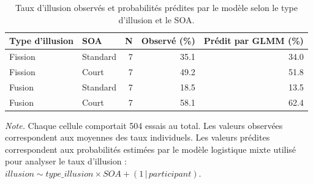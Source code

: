 \begin{table}[ht]
\centering
\caption{Taux d’illusion observés et probabilités prédites par le modèle selon le type d’illusion et le SOA.}
\label{tab:illusion_descriptives_v2}
\footnotesize
\begin{tabular}{llrrr}
\toprule
Type d’illusion & SOA & N & Observé (\%) & Prédit par GLMM (\%) \\
\midrule
Fission & Standard & 7 & 35.1 & 34.0 \\
Fission & Court & 7 & 49.2 & 51.8 \\
Fusion & Standard & 7 & 18.5 & 13.5 \\
Fusion & Court & 7 & 58.1 & 62.4 \\
\bottomrule
\end{tabular}

\vspace{0.2cm}
\begin{minipage}{0.92\textwidth}
\footnotesize
\textit{Note.} Chaque cellule comportait 504 essais au total. Les valeurs observées correspondent aux moyennes des taux individuels. Les valeurs prédites correspondent aux probabilités estimées par le modèle logistique mixte utilisé pour analyser le taux d’illusion : $illusion \sim type\_illusion \times SOA + (1\,|\,participant)$.
\end{minipage}
\end{table}
